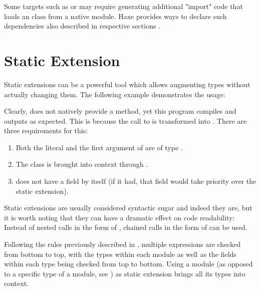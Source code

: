 Some targets such as  or  may require generating additional "import" code that loads an  class from a native module. Haxe provides ways to declare such dependencies also described in respective sections .

\section{Static Extension}
\label{lf-static-extension}


Static extensions can be a powerful tool which allows augmenting types without actually changing them. The following example demonstrates the usage:


Clearly,  does not natively provide a  method, yet this program compiles and outputs  as expected. This is because the call to  is transformed into . There are three requirements for this:

\begin{enumerate}
	\item Both the literal  and the first argument of  are of type .
	\item The class  is brought into context through .
	\item {} does not have a  field by itself (if it had, that field would take priority over the static extension).
\end{enumerate}

Static extensions are usually considered syntactic sugar and indeed they are, but it is worth noting that they can have a dramatic effect on code readability: Instead of nested calls in the form of , chained calls in the form of  can be used.

Following the rules previously described in , multiple  expressions are checked from bottom to top, with the types within each module as well as the fields within each type being checked from top to bottom. Using a module (as opposed to a specific type of a module, see ) as static extension brings all its types into context.

